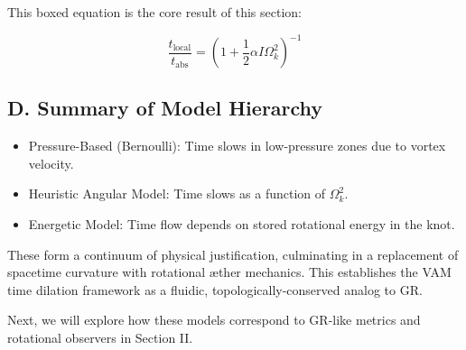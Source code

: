 This boxed equation is the core result of this section:

\begin{equation}
\boxed{\frac{t_{\text{local}}}{t_{\text{abs}}} = \left(1 + \frac{1}{2} \alpha I \Omega_k^2 \right)^{-1}}
\end{equation}

\subsection*{D. Summary of Model Hierarchy}

\begin{itemize}
\item Pressure-Based (Bernoulli): Time slows in low-pressure zones due to vortex velocity.
\item Heuristic Angular Model: Time slows as a function of $\Omega_k^2$.
\item Energetic Model: Time flow depends on stored rotational energy in the knot.
\end{itemize}

These form a continuum of physical justification, culminating in a replacement of spacetime curvature with rotational æther mechanics. This establishes the VAM time dilation framework as a fluidic, topologically-conserved analog to GR.

Next, we will explore how these models correspond to GR-like metrics and rotational observers in Section II.